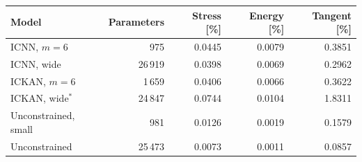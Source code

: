 \begin{tabular}{lrrrr}
\toprule
Model & Parameters & Stress [\%] & Energy [\%] & Tangent [\%] \\
\midrule
ICNN, $m=6$ & 975 & 0.0445 & 0.0079 & 0.3851 \\
ICNN, wide & 26\,919 & 0.0398 & 0.0069 & 0.2962 \\
ICKAN, $m=6$ & 1\,659 & 0.0406 & 0.0066 & 0.3622 \\
ICKAN, wide$^\ast$ & 24\,847 & 0.0744 & 0.0104 & 1.8311 \\
Unconstrained, small & 981 & 0.0126 & 0.0019 & 0.1579 \\
Unconstrained & 25\,473 & 0.0073 & 0.0011 & 0.0857 \\
\bottomrule
\end{tabular}

\par{}
